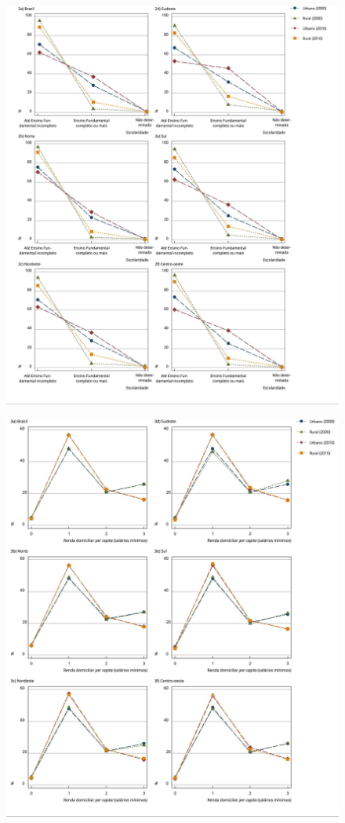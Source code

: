 \documentclass{article}
\begin{document}
\begin{figure}
\includegraphics[width=\textwidth]{1678-4464-csp-33-s1-e00085516-gf2.jpg}
\caption{}\label{fig:f2}
\end{figure}

\begin{figure}
\includegraphics[width=\textwidth]{1678-4464-csp-33-s1-e00085516-gf3.jpg}
\caption{}\label{fig:f3}
\end{figure}
\end{document}
